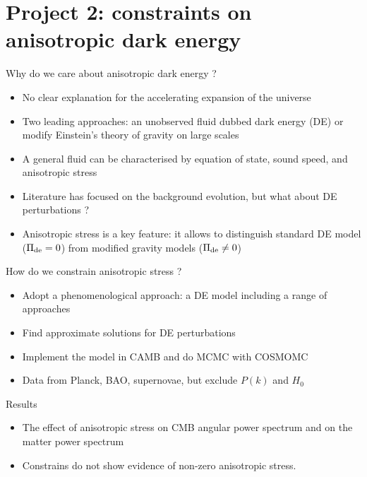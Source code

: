 \documentclass{beamer}
\begin{document}



\section*{Project 2: constraints on anisotropic dark energy}

\begin{frame}{Why do we care about anisotropic dark energy ?}
\begin{itemize}
\item No clear explanation for the accelerating expansion of the universe
\item Two leading approaches: an unobserved fluid dubbed dark energy (DE) or modify Einstein's theory of gravity on large scales
\item A general fluid can be characterised by equation of state, sound speed, and anisotropic stress
\item Literature has focused on the background evolution, but what about DE perturbations ?  
\item Anisotropic stress is a key feature: it allows to distinguish standard DE model ($\Pi_{\rm de} = 0$) from modified gravity models ($\Pi_{\rm de}\neq 0$)
\end{itemize}
\end{frame}

\begin{frame}{How do we constrain anisotropic stress ?}
\begin{itemize}
\item Adopt a phenomenological approach: a DE model including a range of approaches
\item Find approximate solutions for DE perturbations
\item Implement the model in CAMB and do MCMC with COSMOMC 
\item Data from Planck, BAO, supernovae, but exclude $P(k)$ and $H_0$
\end{itemize}
\end{frame}

\begin{frame}{Results}
\begin{itemize}
\item The effect of anisotropic stress on CMB angular power spectrum and on the matter power spectrum
\item Constrains do not show evidence of non-zero anisotropic stress. 
\end{itemize}
\end{frame}
\end{document}
